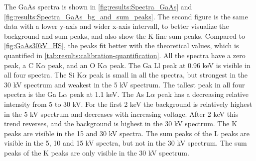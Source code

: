 The GaAs spectra is shown in \cref{fig:results:Spectra_GaAs} and \cref{fig:results:Spectra_GaAs_bg_and_sum_peaks}.
The second figure is the same data with a lower y-axis and wider x-axis intervall, to better visualize the background and sum peaks, and also show the K-line sum peaks.
Compared to \cref{fig:GaAs30kV_HS}, the peaks fit better with the theoretical values, which is quantified in \cref{tab:results:calibration-quantification}. %
All the spectra have a zero peak, a C K$\alpha$ peak, and an O K$\alpha$ peak.
The Ga Ll peak at 0.96 keV is visible in all four spectra.
The Si K$\alpha$ peak is small in all the spectra, but strongest in the 30 kV spectrum and weakest in the 5 kV spectrum.
The tallest peak in all four spectra is the Ga L$\alpha$ peak at 1.1 keV.
The As L$\alpha$ peak has a decreasing relative intensity from 5 to 30 kV.
For the first 2 keV the background is relatively highest in the 5 kV spectrum and decreases with increasing voltage.
After 2 keV this trend reverses, and the background is highest in the 30 kV spectrum. %
The K peaks are visible in the 15 and 30 kV spectra.
The sum peaks of the L peaks are visible in the 5, 10 and 15 kV spectra, but not in the 30 kV spectrum.
The sum peaks of the K peaks are only visible in the 30 kV spectrum. %




